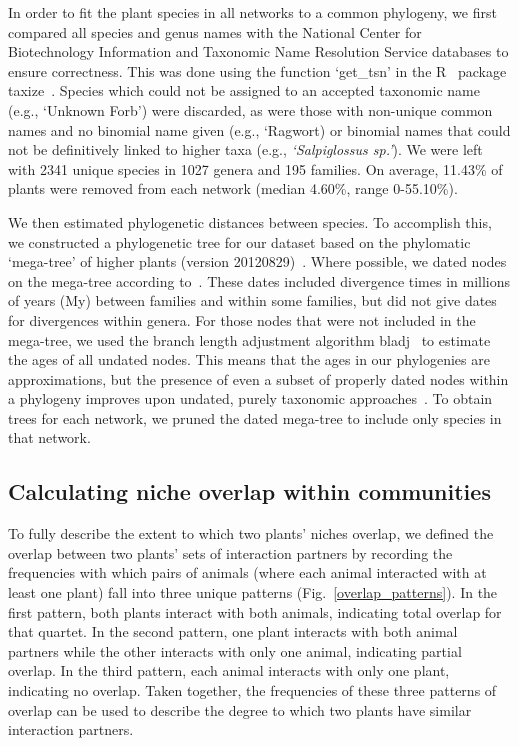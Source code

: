 \documentclass[12pt]{article}
\begin{document}
\begin{spacing}{1.5}
  In order to fit the plant species in all networks to a common phylogeny, 
  we first compared all species and genus names with the 
  National Center for Biotechnology Information
  and Taxonomic Name Resolution Service databases to ensure
  correctness. This was done using the function `get\_tsn' in the R~\citep{R}
  package taxize~\citep{taxize1,taxize2}. Species which could not 
  be assigned to an accepted taxonomic name (e.g., `Unknown Forb') were 
  discarded, as were those with non-unique common names and no binomial 
  name given (e.g., `Ragwort) or binomial names that could not be definitively 
  linked to  higher taxa (e.g., \emph{`Salpiglossus sp.'}). We were left with 
  2341 unique species in 1027 genera and 195 families. On average, 11.43\% of 
  plants were removed from each network (median 4.60\%, range 0-55.10\%).


  We then estimated phylogenetic distances between species. To accomplish 
  this, we constructed a phylogenetic tree for our dataset based on the 
  phylomatic `mega-tree' of higher plants (version 20120829)~\citep{APG2009}. 
  Where possible, we dated nodes on the mega-tree according to~\citet{Wikstrom2001}. 
  These dates included divergence times in millions of years (My) between families and 
  within some families, but did not give dates for divergences within genera. For those
  nodes that were not included in the mega-tree, we used the branch length adjustment
  algorithm bladj~\citep{Webb2008} to estimate the ages of all undated nodes. This 
  means that the ages in our phylogenies are approximations, but the presence of 
  even a subset of properly dated nodes within a phylogeny improves upon undated, purely
  taxonomic approaches~\citep{Webb2000}. To obtain trees for each network, we 
  pruned the dated mega-tree to include only species in that network.


\subsection*{Calculating niche overlap within communities}

  To fully describe the extent to which two plants' niches overlap,
  we defined the overlap between two plants' sets of interaction partners
  by recording the frequencies with which pairs of animals (where each animal 
  interacted with at least one plant) fall into three unique patterns
  (Fig.~\ref{overlap_patterns}). In the first pattern, both plants interact 
  with both animals, indicating total overlap for that quartet. In the second pattern, one plant
  interacts with both animal partners while the other
  interacts with only one animal, indicating partial overlap. In the third pattern,
  each animal interacts with only one plant, indicating no overlap. 
  Taken together, the frequencies of these three patterns of
  overlap can be used to describe the degree to which two plants have
  similar interaction partners. %



\end{spacing}
\end{document}
